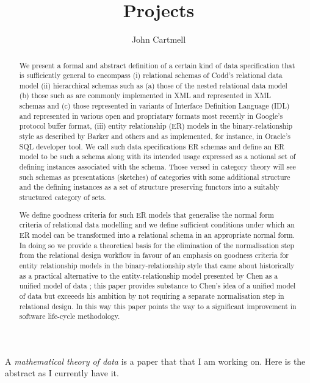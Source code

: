 \documentclass[10pt,a4paper]{article}
\theoremstyle{remark}
\begin{document}
\title{Projects}

\author{John Cartmell}

\maketitle

\note 
A \textit{mathematical theory of data} is a paper that that I am working on. Here is the abstract as I currently have it.
\begin{abstract}
We present a formal and abstract definition  of a certain kind of data specification that is sufficiently general to encompass  
(i) relational schemas of Codd's relational data model \cite{Codd1970}
(ii) hierarchical schemas such as (a) those of the nested relational data model (b) those such as are commonly implemented in XML and represented in XML schemas and (c) those represented in variants of Interface Definition Language (IDL) and represented in various open and propriatary formats most recently 
in Google's protocol buffer format,
(iii) entity relationship (ER) models in the binary-relationship style as described by Barker \cite{RichardBarkerBook} and others \cite{Rock-Evans1989}  and as implemented, for instance, in Oracle's SQL developer tool. 
We call such data specifications ER schemas and define an ER model to be such a schema along with its intended usage expressed as a notional set of defining instances associated with the schema. Those versed in category theory will see such schemas as presentations (sketches) of categories with some additional structure and the defining instances as a set of structure preserving functors into a suitably structured category of sets. 

We define  goodness criteria for such ER models that generalise 
the normal form criteria of relational data modelling and we define sufficient conditions under which an ER model can be transformed into a relational schema in an appropriate normal form.  In doing so we provide a theoretical basis for the elimination of the normalisation step from the relational design workflow 
in favour of an emphasis on goodness criteria for entity relationship models in the binary-relationship style that came about historically as a practical alternative to the entity-relationship model  presented by Chen as a unified model of data \cite{Chen1976}; this paper provides substance  to
Chen's idea of a unified model of data but exceeeds his ambition by not requiring a separate normalisation step in relational design. In this way this paper points the way to a significant improvement in software life-cycle methodology.
\end{abstract}
\end{document}
